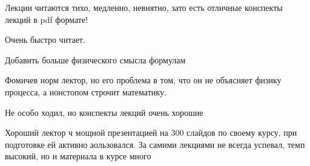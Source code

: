             \begin{commentbox} 
                Лекции читаются тихо, медленно, невнятно, зато есть отличные конспекты лекций в pdf формате! 
            \end{commentbox} 
        
            \begin{commentbox} 
                Очень быстро читает. 
            \end{commentbox} 
        
            \begin{commentbox} 
                Добавить больше  физического смысла формулам  
            \end{commentbox} 
        
            \begin{commentbox} 
                Фомичев норм лектор, но его проблема в том, что он не объясняет физику процесса, а нонстопом строчит математику.  
            \end{commentbox} 
        
            \begin{commentbox} 
                Не особо ходил, но конспекты лекций очень хорошие 
            \end{commentbox} 
        
            \begin{commentbox} 
                Хороший лектор ч мощной презентацией на 300 слайдов по своему курсу, при подготовке ей активно аользовался. За самими лекциями не всегда успевал, темп высокий, но и материала в курсе много 
            \end{commentbox}  

    
